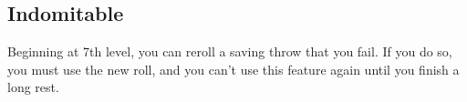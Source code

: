 \begin{multicols*}{2}
\section*{Indomitable}

Beginning at 7th level, you can reroll a saving throw that you fail. If you do so, you must use the new roll, and you can’t use this feature again until you finish a long rest.




\end{multicols*}

\clearpage





